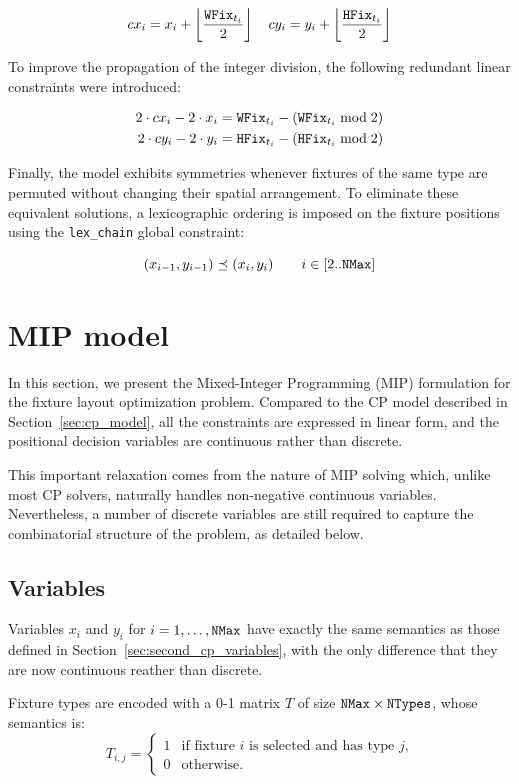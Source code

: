 \begin{align*}
	cx_i = x_i + \left\lfloor \frac{\mathtt{WFix}_{t_i}}{2} \right\rfloor \quad
	cy_i = y_i + \left\lfloor \frac{\mathtt{HFix}_{t_i}}{2} \right\rfloor 
\end{align*}

To improve the propagation of the integer division, the following redundant linear constraints were introduced:

\begin{align*}
	2 \cdot cx_i - 2 \cdot x_i = \mathtt{WFix}_{t_i} - (\mathtt{WFix}_{t_i} \bmod 2) \\
	2 \cdot cy_i - 2 \cdot y_i = \mathtt{HFix}_{t_i} - (\mathtt{HFix}_{t_i} \bmod 2)
\end{align*}

Finally, the model exhibits symmetries whenever fixtures of the same type are permuted without changing their spatial arrangement. To eliminate these equivalent solutions, a lexicographic ordering is imposed on the fixture positions using the \texttt{lex\_chain} global constraint:

\[
(x_{i-1},y_{i-1}) \preceq (x_i,y_i)
\qquad i \in [2..\mathtt{NMax}]
\]

\section{MIP model}
\label{sec:mip_model}

In this section, we present the Mixed-Integer Programming (MIP) formulation for the fixture layout optimization problem. Compared to the CP model described in Section~\ref{sec:cp_model}, all the constraints are expressed in linear form, and the positional decision variables are continuous rather than discrete.

This important relaxation comes from the nature of MIP solving which, unlike most CP solvers, naturally handles non-negative continuous variables.
Nevertheless, a number of discrete variables are still required to capture the combinatorial structure of the problem, as detailed below.

\subsection{Variables}
Variables $x_i$ and $y_i$ for $i=1,\dots,\mathtt{NMax}$ have exactly the same semantics as those defined in Section~\ref{sec:second_cp_variables}, with the only difference that they are now continuous reather than discrete.

Fixture types are encoded with a 0-1 matrix $T$ of size $\mathtt{NMax} \times \mathtt{NTypes}$, whose semantics is:
\[
T_{i,j} =
\begin{cases}
	1 & \text{if fixture $i$ is selected and has type $j$,} \\
	0 & \text{otherwise.}
\end{cases}
\]

